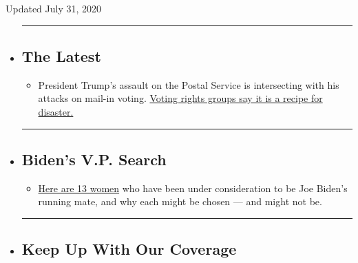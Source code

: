 Updated July 31, 2020

\begin{itemize}
\item
  \begin{center}\rule{0.5\linewidth}{\linethickness}\end{center}

  \hypertarget{the-latest}{%
  \subsection{The Latest}\label{the-latest}}

  \begin{itemize}
  \tightlist
  \item
    President Trump's assault on the Postal Service is intersecting with
    his attacks on mail-in voting.
    \href{https://www.nytimes3xbfgragh.onion/2020/07/31/us/politics/trump-usps-mail-delays.html?action=click\&pgtype=Article\&state=default\&region=BELOW_MAIN_CONTENT\&context=storylines_guide}{Voting
    rights groups say it is a recipe for disaster.}
  \end{itemize}
\item
  \begin{center}\rule{0.5\linewidth}{\linethickness}\end{center}

  \hypertarget{bidens-vp-search}{%
  \subsection{Biden's V.P. Search}\label{bidens-vp-search}}

  \begin{itemize}
  \tightlist
  \item
    \href{https://www.nytimes3xbfgragh.onion/article/biden-vice-president-2020.html?action=click\&pgtype=Article\&state=default\&region=BELOW_MAIN_CONTENT\&context=storylines_guide}{Here
    are 13 women} who have been under consideration to be Joe Biden's
    running mate, and why each might be chosen --- and might not be.
  \end{itemize}
\item
  \begin{center}\rule{0.5\linewidth}{\linethickness}\end{center}

  \hypertarget{keep-up-with-our-coverage}{%
  \subsection{Keep Up With Our
  Coverage}\label{keep-up-with-our-coverage}}


\end{itemize}
